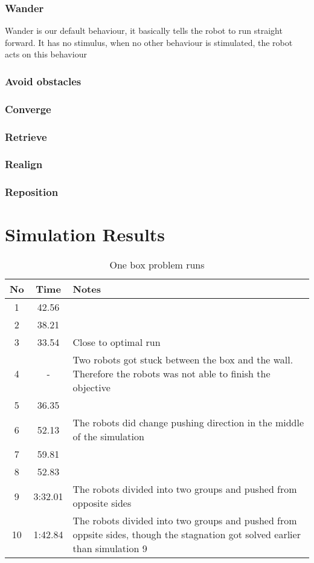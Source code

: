 \documentclass{article}
\begin{document}
\subsubsection{Wander}
Wander is our default behaviour, it basically tells the robot to run straight forward. It has no stimulus, when no other behaviour is stimulated, the robot acts on this behaviour

\subsubsection{Avoid obstacles}


\subsubsection{Converge}


\subsubsection{Retrieve}

\subsubsection{Realign}

\subsubsection{Reposition}

\section{Simulation Results}

\begin{table}[h!]
\centering
\begin{tabular}{ c | c | p{5cm}}
\hline No & Time & Notes \\ \hline
 1 & 42.56 &  \\ \hline
 2 & 38.21 & \\ \hline
 3 & 33.54 & Close to optimal run \\ \hline
4 & - & Two robots got stuck between the box and the wall. Therefore the robots was not able to finish the objective \\ \hline
5 & 36.35 & \\ \hline
6	& 52.13 & The robots did change pushing direction in the middle of the simulation \\ \hline
7 & 59.81 & \\ \hline
8 & 52.83 & \\ \hline
9 & 3:32.01 &  The robots divided into two groups and pushed from opposite sides \\ \hline
10 & 1:42.84 & The robots divided into two groups and pushed from oppsite sides, though the stagnation got solved earlier than simulation 9 \\
\end{tabular}
\caption{One box problem runs}
\end{table}
\end{document}

